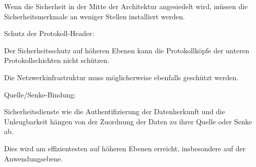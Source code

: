 \documentclass[a4paper]{article}
\begin{document}
\begin{multicols}{3}
\begin{itemize*}
\begin{itemize*}
                  \item Wenn die Sicherheit in der Mitte der Architektur angesiedelt wird, müssen die Sicherheitsmerkmale an weniger Stellen installiert werden.
            \end{itemize*}
            \item Schutz der Protokoll-Header:
            \begin{itemize*}
                  \item Der Sicherheitsschutz auf höheren Ebenen kann die Protokollköpfe der unteren Protokollschichten nicht schützen.
                  \item Die Netzwerkinfrastruktur muss möglicherweise ebenfalls geschützt werden.
            \end{itemize*}
            \item Quelle/Senke-Bindung:
            \begin{itemize*}
                  \item Sicherheitsdienste wie die Authentifizierung der Datenherkunft und die Unleugbarkeit hängen von der Zuordnung der Daten zu ihrer Quelle oder Senke ab.
                  \item Dies wird am effizientesten auf höheren Ebenen erreicht, insbesondere auf der Anwendungsebene.
            \end{itemize*}
      \end{itemize*}


\end{multicols}
\end{document}
